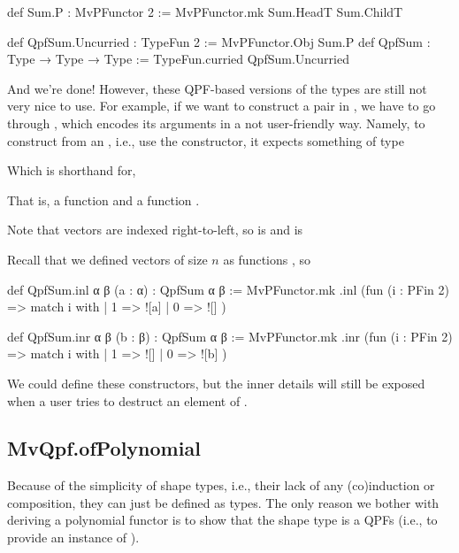 \begin{leancode}
    def Sum.P  : MvPFunctor 2 := MvPFunctor.mk Sum.HeadT  Sum.ChildT
    
    def QpfSum.Uncurried : TypeFun 2 := MvPFunctor.Obj Sum.P
    def QpfSum : Type → Type → Type  := TypeFun.curried QpfSum.Uncurried
\end{leancode}

And we're done! However, these QPF-based versions of the types are still not very nice to use.
For example, if we want to construct a pair in , we have to go through ,
which encodes its arguments in a not user-friendly way. 
Namely, to construct  from an , i.e., use the  constructor, 
it expects something of type
\begin{center}
\end{center}
Which is shorthand for, 
\begin{center}
\end{center}
That is, a function  and a function .
\begin{remark}
    Note that vectors are indexed right-to-left, so  is 
    and  is 
\end{remark}

Recall that we defined vectors of size $n$ as functions , so 


\begin{leancode}
    def QpfSum.inl {α β} (a : α) : QpfSum α β :=
      MvPFunctor.mk .inl (fun (i : PFin 2) => match i with
        | 1 => ![a]
        | 0 => ![]
      )
    
    def QpfSum.inr {α β} (b : β) : QpfSum α β :=
      MvPFunctor.mk .inr (fun (i : PFin 2) => match i with
        | 1 => ![]
        | 0 => ![b]
      )
\end{leancode}


We could define these constructors, but the inner details will still be exposed
when a user tries to destruct an element of .

\subsection{MvQpf.ofPolynomial}
Because of the simplicity of shape types, i.e., their lack of any (co)induction or composition, 
they can just be defined as \inductive{} types.
The only reason we bother with deriving a polynomial functor is to show that
the shape type is a QPFs (i.e., to provide an instance of ).

